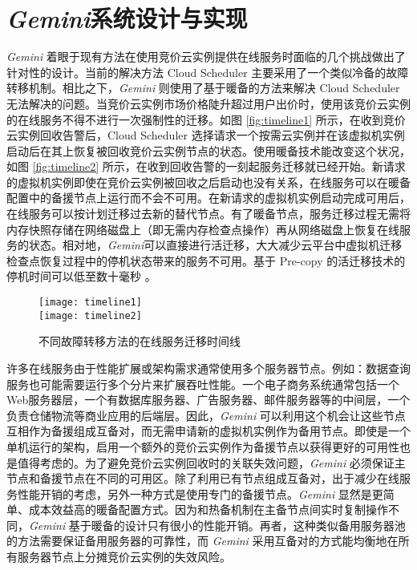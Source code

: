 \section{\emph{Gemini}系统设计与实现}
\label{sec-gemini}
\emph{Gemini} 着眼于现有方法在使用竞价云实例提供在线服务时面临的几个挑战做出了针对性的设计。当前的解决方法 Cloud Scheduler \cite{He:2015:CCH:2749246.2749275} 主要采用了一个类似冷备的故障转移机制。相比之下，\emph{Gemini} 则使用了基于暖备的方法来解决 Cloud Scheduler 无法解决的问题。当竞价云实例市场价格陡升超过用户出价时，使用该竞价云实例的在线服务不得不进行一次强制性的迁移。如图 \ref{fig:timeline1} 所示，在收到竞价云实例回收告警后，Cloud Scheduler 选择请求一个按需云实例并在该虚拟机实例启动后在其上恢复被回收竞价云实例节点的状态。使用暖备技术能改变这个状况，如图 \ref{fig:timeline2} 所示，在收到回收告警的一刻起服务迁移就已经开始。新请求的虚拟机实例即使在竞价云实例被回收之后启动也没有关系，在线服务可以在暖备配置中的备援节点上运行而不会不可用。在新请求的虚拟机实例启动完成可用后，在线服务可以按计划迁移过去新的替代节点。有了暖备节点，服务迁移过程无需将内存快照存储在网络磁盘上（即无需内存检查点操作）再从网络磁盘上恢复在线服务的状态。相对地，\emph{Gemini}可以直接进行活迁移，大大减少云平台中虚拟机迁移检查点恢复过程中的停机状态带来的服务不可用。基于 Pre-copy 的活迁移技术的停机时间可以低至数十毫秒 \cite{Clark:2005:LMV:1251203.1251223}。
\begin{figure}
  \centering%
    {\texttt{[image: timeline1]}}%
  \\
  \vspace{5em}%
      {\texttt{[image: timeline2]}}
  \vspace{5em}%
  \caption{不同故障转移方法的在线服务迁移时间线}
  \label{fig:timeline}
\end{figure}

许多在线服务由于性能扩展或架构需求通常使用多个服务器节点。例如：数据查询服务也可能需要运行多个分片来扩展吞吐性能。一个电子商务系统通常包括一个Web服务器层，一个有数据库服务器、广告服务器、邮件服务器等的中间层，一个负责仓储物流等商业应用的后端层。因此，\emph{Gemini} 可以利用这个机会让这些节点互相作为备援组成互备对，而无需申请新的虚拟机实例作为备用节点。即使是一个单机运行的架构，启用一个额外的竞价云实例作为备援节点以获得更好的可用性也是值得考虑的。为了避免竞价云实例回收时的关联失效问题，\emph{Gemini} 必须保证主节点和备援节点在不同的可用区。除了利用已有节点组成互备对，出于减少在线服务性能开销的考虑，另外一种方式是使用专门的备援节点。\emph{Gemini} 显然是更简单、成本效益高的暖备配置方式。因为和热备机制在主备节点间实时复制操作不同，\emph{Gemini} 基于暖备的设计只有很小的性能开销。再者，这种类似备用服务器池的方法需要保证备用服务器的可靠性，而 \emph{Gemini} 采用互备对的方式能均衡地在所有服务器节点上分摊竞价云实例的失效风险。

